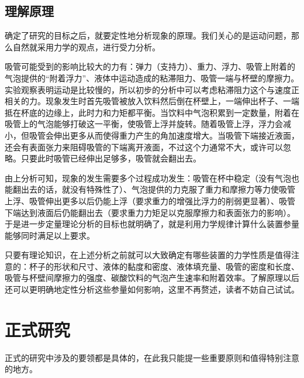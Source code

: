 \documentclass[a4paper,10pt,english]{sphinxmanual}
\begin{document}
\subsection{理解原理}
\label{\detokenize{6. Research:id4}}
确定了研究的目标之后，就要定性地分析现象的原理。我们关心的是运动问题，那么自然就采用力学的观点，进行受力分析。

吸管可能受到的影响比较大的力有：弹力（支持力）、重力、浮力、吸管上附着的气泡提供的“附着浮力”、液体中运动造成的粘滞阻力、吸管一端与杯壁的摩擦力。实验观察表明运动是比较慢的，所以初步的分析中可以考虑粘滞阻力这个与速度正相关的力。现象发生时首先吸管被放入饮料然后倒在杯壁上，一端伸出杯子、一端抵在杯底的边缘上，此时力和力矩都平衡。当饮料中气泡积累到一定数量，附着在吸管上的气泡能够打破这一平衡，使吸管上浮并旋转。随着吸管上浮，浮力会减小，但吸管会伸出更多从而使得重力产生的角加速度增大。当吸管下端接近液面，还会有表面张力来阻碍吸管的下端离开液面，不过这个力通常不大，或许可以忽略。只要此时吸管已经伸出足够多，吸管就会翻出去。

由上分析可知，现象的发生需要多个过程成功发生：吸管在杯中稳定（没有气泡也能翻出去的话，就没有特殊性了）、气泡提供的力克服了重力和摩擦力等力使吸管上浮、吸管伸出更多以后仍能上浮（要求重力的增强比浮力的削弱更显著）、吸管下端达到液面后仍能翻出去（要求重力力矩足以克服摩擦力和表面张力的影响）。于是进一步定量理论分析的目标也就明确了，就是利用力学规律计算什么装置参量能够同时满足以上要求。

只要有理论知识，在上述分析之前就可以大致确定有哪些装置的力学性质是值得注意的：杯子的形状和尺寸、液体的黏度和密度、液体填充量、吸管的密度和长度、吸管与杯壁间摩擦力的强度、碳酸饮料的气泡产生速率和附着效率。了解原理以后还可以更明确地定性分析这些参量如何影响，这里不再赘述，读者不妨自己试试。


\section{正式研究}
\label{\detokenize{6. Research:id5}}
正式的研究中涉及的要领都是具体的，在此我只能提一些重要原则和值得特别注意的地方。
\end{document}
